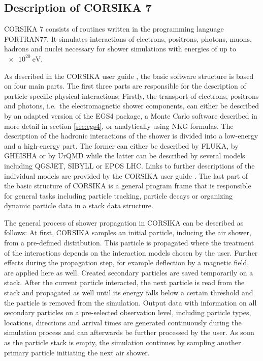 \subsection{Description of CORSIKA 7}

CORSIKA 7 consists of routines written in the programming language FORTRAN77.
It simulates interactions of electrons, positrons, photons, muons, hadrons and nuclei necessary for shower simulations with energies of up to $\SI{e20}{\electronvolt}$.

As described in the CORSIKA user guide \cite{userguide}, the basic software structure is based on four main parts.
The first three parts are responsible for the description of particle-specific physical interactions:
Firstly, the transport of electrons, positrons and photons, i.e.\ the electromagnetic shower components, can either be described by an adapted version of the EGS4 package, a Monte Carlo software described in more detail in section \ref{sec:egs4}, or analytically using NKG formulas.
The description of the hadronic interactions of the shower is divided into a low-energy and a high-energy part.
The former can either be described by FLUKA, by GHEISHA or by UrQMD while the latter can be described by several models including QGSJET, SIBYLL or EPOS LHC.
Links to further descriptions of the individual models are provided by the CORSIKA user guide \cite{userguide}.
The last part of the basic structure of CORSIKA is a general program frame that is responsible for general tasks including particle tracking, particle decays or organizing dynamic particle data in a stack data structure.

The general process of shower propagation in CORSIKA can be described as follows:
At first, CORSIKA samples an initial particle, inducing the air shower, from a pre-defined distribution.
This particle is propagated where the treatment of the interactions depends on the interaction models chosen by the user.
Further effects during the propagation step, for example deflection by a magnetic field, are applied here as well.
Created secondary particles are saved temporarily on a stack.
After the current particle interacted, the next particle is read from the stack and propagated as well until its energy falls below a certain threshold and the particle is removed from the simulation.
Output data with information on all secondary particles on a pre-selected observation level, including particle types, locations, directions and arrival times are generated continuously during the simulation process and can afterwards be further processed by the user.
As soon as the particle stack is empty, the simulation continues by sampling another primary particle initiating the next air shower.

